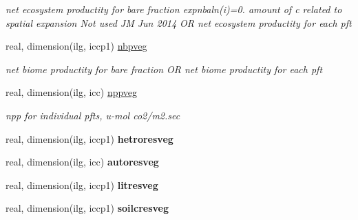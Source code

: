 \begin{DoxyCompactItemize}
\begin{DoxyCompactList}\small\item\em net ecosystem productity for bare fraction expnbaln(i)=0. amount of c related to spatial expansion Not used J\+M Jun 2014 O\+R net ecosystem productity for each pft \end{DoxyCompactList}\item 
\hypertarget{structctem__statevars_1_1veg__gat_a7d3b547d72b26a9e5c89cb64262ea269}{}real, dimension(ilg, iccp1) \hyperlink{structctem__statevars_1_1veg__gat_a7d3b547d72b26a9e5c89cb64262ea269}{nbpveg}\label{structctem__statevars_1_1veg__gat_a7d3b547d72b26a9e5c89cb64262ea269}

\begin{DoxyCompactList}\small\item\em net biome productity for bare fraction O\+R net biome productity for each pft \end{DoxyCompactList}\item 
\hypertarget{structctem__statevars_1_1veg__gat_aa61a73dccf247c53360e423c89d884c4}{}real, dimension(ilg, icc) \hyperlink{structctem__statevars_1_1veg__gat_aa61a73dccf247c53360e423c89d884c4}{nppveg}\label{structctem__statevars_1_1veg__gat_aa61a73dccf247c53360e423c89d884c4}

\begin{DoxyCompactList}\small\item\em npp for individual pfts, u-\/mol co2/m2.\+sec \end{DoxyCompactList}\item 
\hypertarget{structctem__statevars_1_1veg__gat_a2921670a3d2139eec90824225856000d}{}real, dimension(ilg, iccp1) {\bfseries hetroresveg}\label{structctem__statevars_1_1veg__gat_a2921670a3d2139eec90824225856000d}

\item 
\hypertarget{structctem__statevars_1_1veg__gat_ab30220c0ecad7c78f7224b6835a7a0e1}{}real, dimension(ilg, icc) {\bfseries autoresveg}\label{structctem__statevars_1_1veg__gat_ab30220c0ecad7c78f7224b6835a7a0e1}

\item 
\hypertarget{structctem__statevars_1_1veg__gat_a94a989f1a031e912e76d9400c69a60ef}{}real, dimension(ilg, iccp1) {\bfseries litresveg}\label{structctem__statevars_1_1veg__gat_a94a989f1a031e912e76d9400c69a60ef}

\item 
\hypertarget{structctem__statevars_1_1veg__gat_a6162ac3b0dbcbf97ad3ef1ac2480202a}{}real, dimension(ilg, iccp1) {\bfseries soilcresveg}\label{structctem__statevars_1_1veg__gat_a6162ac3b0dbcbf97ad3ef1ac2480202a}


\end{DoxyCompactItemize}
